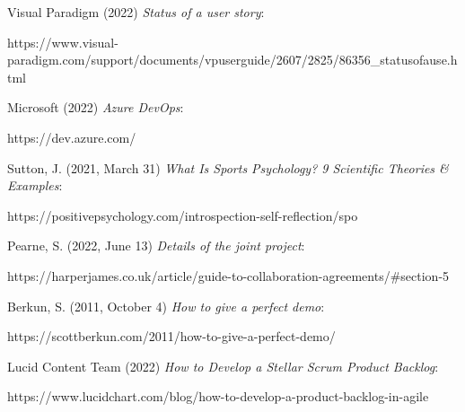 \documentclass[10pt]{report}
\begin{document}
\begin{thebibliography}{1}
Visual Paradigm (2022) \emph{Status of a user story}:

https://www.visual-paradigm.com/support/documents/vpuserguide/2607/2825/86356\_statusofause.html

Microsoft (2022) \emph{Azure DevOps}:

https://dev.azure.com/

Sutton, J. (2021, March 31) \emph{What Is Sports Psychology? 9 Scientific Theories \& Examples}:

https://positivepsychology.com/introspection-self-reflection/spo

Pearne, S. (2022, June 13) \emph{Details of the joint project}:

https://harperjames.co.uk/article/guide-to-collaboration-agreements/\#section-5

Berkun, S. (2011, October 4) \emph{How to give a perfect demo}:

https://scottberkun.com/2011/how-to-give-a-perfect-demo/

Lucid Content Team (2022) \emph{How to Develop a Stellar Scrum Product Backlog}:

https://www.lucidchart.com/blog/how-to-develop-a-product-backlog-in-agile

\end{thebibliography}

\newpage
\end{document}
